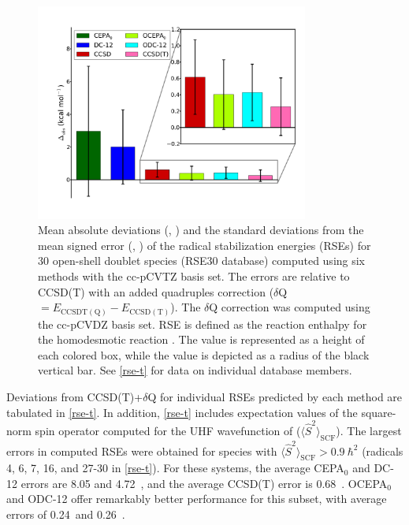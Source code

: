 \begin{figure}
	\centering
	\caption{%
        \label{rse-f}
        Mean absolute deviations (\mae, \kcal) and the standard deviations from
        the mean signed error (\std, \kcal) of the radical stabilization
        energies (RSEs) for 30 open-shell doublet species (RSE30 database)
        computed using six methods with the cc-pCVTZ basis set.
        The errors are relative to CCSD(T) with an added quadruples correction
        ($\delta$Q  $= E_\mathrm{CCSDT(Q)}-E_\mathrm{CCSD(T)}$).
        The $\delta$Q correction was computed using the cc-pCVDZ basis set.
        RSE is defined as the reaction enthalpy for the homodesmotic reaction
        .
        The \mae value is represented as a height of each colored box, while the
        \std value is depicted as a radius of the black vertical bar.
        See \cref{rse-t} for data on individual database members.
	}
	\includegraphics[width=0.8\textwidth]{figures/rse.pdf}
\end{figure}

Deviations from CCSD(T){+}\(\delta\)Q for individual RSEs predicted by each
method are tabulated in \cref{rse-t}.
In addition, \cref{rse-t} includes expectation values of the square-norm spin
operator computed for the UHF wavefunction of 
($\langle\hat{S}^2\rangle_\mathrm{SCF}$).
The largest errors in computed RSEs were obtained for  species with
\(
    \langle\hat{S}^2\rangle_\mathrm{SCF}
    >
    0.9\
    \hbar^2
\)
(radicals 4, 6, 7, 16, and 27-30 in \cref{rse-t}).
For these systems, the average CEPA$_0$ and DC-12 errors are 8.05 and
4.72~\kcal, and the average CCSD(T) error is 0.68~\kcal.
OCEPA$_0$ and ODC-12 offer remarkably better performance for this subset, with
average errors of 0.24~\kcal and 0.26~\kcal.


